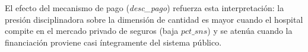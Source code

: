 El efecto del mecanismo de pago (\textit{desc\_pago}) refuerza esta interpretación: la presión disciplinadora sobre la dimensión de cantidad es mayor cuando el hospital compite en el mercado privado de seguros (baja \(\textit{pct\_sns}\)) y se atenúa cuando la financiación proviene casi íntegramente del sistema público.
